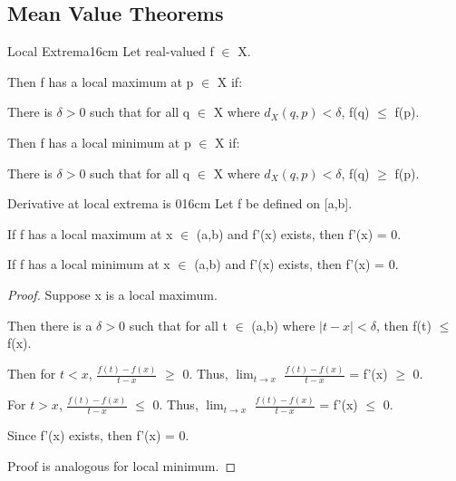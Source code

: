     \vspace{0.5cm}





\subsection{ Mean Value Theorems }

    \begin{definition}{Local Extrema}{16cm}
        Let real-valued f $\in$ X.
        
        Then f has a {\color{lblue} local maximum} at p $\in$ X if:
        
        \hspace{0.5cm}
        There is $\delta > 0$ such that for all q $\in$ X where $d_X(q,p) < \delta$,
        f(q) $\leq$ f(p).
        
        Then f has a {\color{lblue} local minimum} at p $\in$ X if:

        \hspace{0.5cm}
        There is $\delta > 0$ such that for all q $\in$ X where $d_X(q,p) < \delta$,
        f(q) $\geq$ f(p).
    \end{definition}

    \vspace{0.5cm}



    \begin{wtheorem}{Derivative at local extrema is 0}{16cm}
        Let f be defined on [a,b].
        
        If f has a local maximum at x $\in$ (a,b) and f'(x) exists, then
        f'(x) = 0.

        If f has a local minimum at x $\in$ (a,b) and f'(x) exists, then
        f'(x) = 0.
    \end{wtheorem}

    \begin{proof}
        Suppose x is a local maximum.
        
        Then there is a $\delta > 0$ such that for all t $\in$ (a,b)
        where $|t - x| < \delta$, then f(t) $\leq$ f(x).

        Then for $t < x$, $\frac{f(t) - f(x)}{t - x}$ $\geq$ 0.
        Thus, $\lim_{t \rightarrow x}$ $\frac{f(t) - f(x)}{t - x}$ = f'(x) $\geq$ 0. 

        For $t > x$, $\frac{f(t) - f(x)}{t - x}$ $\leq$ 0.
        Thus, $\lim_{t \rightarrow x}$ $\frac{f(t) - f(x)}{t - x}$ = f'(x) $\leq$ 0.

        Since f'(x) exists, then f'(x) = 0.

        Proof is analogous for local minimum.
    \end{proof}

